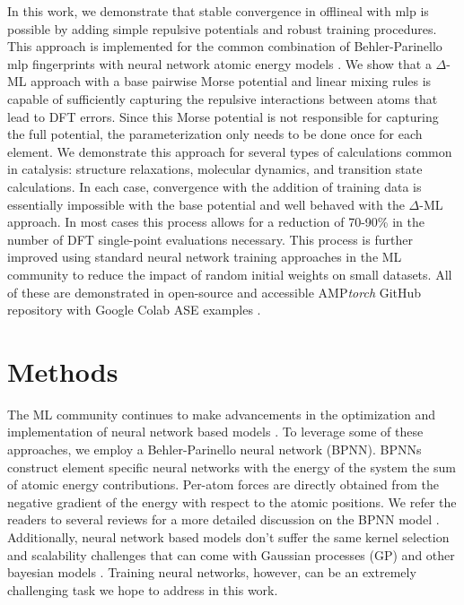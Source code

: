 \documentclass[%
 reprint,
 amsmath,amssymb,
 aps,
]{revtex4-2}
\begin{document}
In this work, we demonstrate that stable convergence in \gls{offlineal} with \gls{mlp} is possible by adding simple repulsive potentials and robust training procedures. This approach is implemented for the common combination of Behler-Parinello \gls{mlp} fingerprints with neural network atomic energy models \cite{Behler2007}. We show that a $\Delta$-ML approach with a base pairwise Morse potential and linear mixing rules is capable of sufficiently capturing the repulsive interactions between atoms that lead to \gls{DFT} errors. Since this Morse potential is not responsible for capturing the full potential, the parameterization only needs to be done once for each element. We demonstrate this approach for several types of calculations common in catalysis: structure relaxations, molecular dynamics, and transition state calculations. In each case, convergence with the addition of training data is essentially impossible with the base potential and well behaved with the $\Delta$-ML approach. In most cases this process allows for a reduction of 70-90\% in the number of DFT single-point evaluations necessary.  This process is further improved using standard neural network training approaches in the ML community to reduce the impact of random initial weights on small datasets. All of these are demonstrated in open-source and accessible AMP\textit{torch} GitHub repository with Google Colab ASE examples \cite{amptorch, examples}. 

\section{Methods}
The ML community continues to make advancements in the optimization and implementation of neural network based models \cite{Loshchilov2019, Fey2019, Paszke2019}. To leverage some of these approaches, we employ a Behler-Parinello neural network (BPNN). BPNNs construct element specific neural networks with the energy of the system the sum of atomic energy contributions. Per-atom forces are directly obtained from the negative gradient of the energy with respect to the atomic positions. We refer the readers to several reviews for a more detailed discussion on the BPNN model \cite{Behler2007, Behler2016, Khorshidi2016}. Additionally, neural network based models don't suffer the same kernel selection and scalability challenges that can come with Gaussian processes (GP) and other bayesian models \cite{Bartok2015}. Training neural networks, however, can be an extremely challenging task we hope to address in this work.
\end{document}

